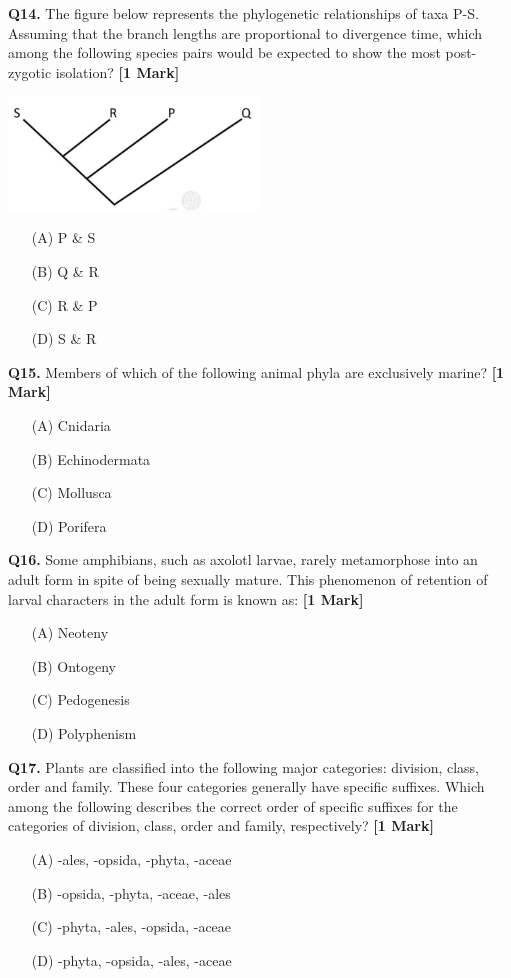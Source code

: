\documentclass[11pt]{article}
\newcommand{\questiona}[2]{
    \noindent\textbf{Q#2.} #1 \hfill \textbf{[1 Mark]}
}
\begin{document}
\questiona{The figure below represents the phylogenetic relationships of taxa P-S. Assuming that the branch lengths are proportional to divergence time, which among the following species pairs would be expected to show the most post-zygotic isolation?}{14}
\begin{center}
\includegraphics[width=0.5\textwidth]{figures/14.png}
\end{center}
\begin{enumerate}
    \item[(A)] P \& S  
    \item[(B)] Q \& R  
    \item[(C)] R \& P  
    \item[(D)] S \& R  
\end{enumerate}
\vspace{0.5cm}

\questiona{Members of which of the following animal phyla are exclusively marine?}{15}
\begin{enumerate}
    \item[(A)] Cnidaria  
    \item[(B)] Echinodermata  
    \item[(C)] Mollusca  
    \item[(D)] Porifera  
\end{enumerate}
\vspace{0.5cm}

\questiona{Some amphibians, such as axolotl larvae, rarely metamorphose into an adult form in spite of being sexually mature. This phenomenon of retention of larval characters in the adult form is known as:}{16}
\begin{enumerate}
    \item[(A)] Neoteny  
    \item[(B)] Ontogeny  
    \item[(C)] Pedogenesis  
    \item[(D)] Polyphenism  
\end{enumerate}
\vspace{0.5cm}

\questiona{Plants are classified into the following major categories: division, class, order and family. These four categories generally have specific suffixes. Which among the following describes the correct order of specific suffixes for the categories of division, class, order and family, respectively?}{17}
\begin{enumerate}
    \item[(A)] -ales, -opsida, -phyta, -aceae  
    \item[(B)] -opsida, -phyta, -aceae, -ales  
    \item[(C)] -phyta, -ales, -opsida, -aceae  
    \item[(D)] -phyta, -opsida, -ales, -aceae  
\end{enumerate}
\vspace{0.5cm}
\end{document}
